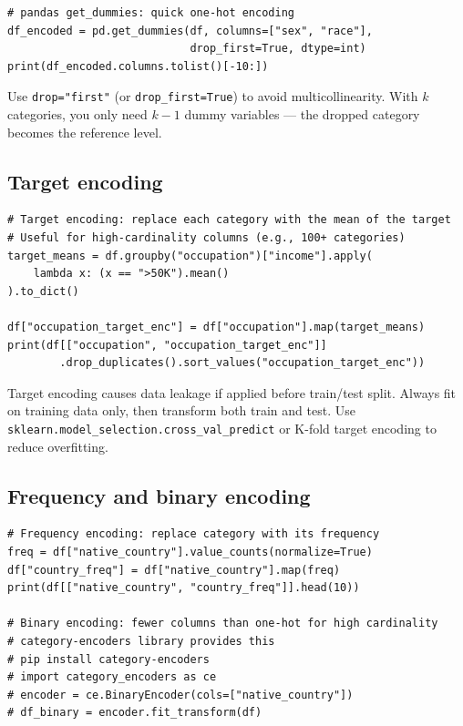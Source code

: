 \begin{verbatim}
# pandas get_dummies: quick one-hot encoding
df_encoded = pd.get_dummies(df, columns=["sex", "race"],
                            drop_first=True, dtype=int)
print(df_encoded.columns.tolist()[-10:])
\end{verbatim}

\begin{preprocesstip}
Use \texttt{drop="first"} (or \texttt{drop\_first=True}) to avoid multicollinearity. With $k$ categories, you only need $k-1$ dummy variables --- the dropped category becomes the reference level.
\end{preprocesstip}

\subsection{Target encoding}

\begin{verbatim}
# Target encoding: replace each category with the mean of the target
# Useful for high-cardinality columns (e.g., 100+ categories)
target_means = df.groupby("occupation")["income"].apply(
    lambda x: (x == ">50K").mean()
).to_dict()

df["occupation_target_enc"] = df["occupation"].map(target_means)
print(df[["occupation", "occupation_target_enc"]]
        .drop_duplicates().sort_values("occupation_target_enc"))
\end{verbatim}

\begin{warningbox}
Target encoding causes data leakage if applied before train/test split. Always fit on training data only, then transform both train and test. Use \texttt{sklearn.model\_selection.cross\_val\_predict} or K-fold target encoding to reduce overfitting.
\end{warningbox}

\subsection{Frequency and binary encoding}

\begin{verbatim}
# Frequency encoding: replace category with its frequency
freq = df["native_country"].value_counts(normalize=True)
df["country_freq"] = df["native_country"].map(freq)
print(df[["native_country", "country_freq"]].head(10))

# Binary encoding: fewer columns than one-hot for high cardinality
# category-encoders library provides this
# pip install category-encoders
# import category_encoders as ce
# encoder = ce.BinaryEncoder(cols=["native_country"])
# df_binary = encoder.fit_transform(df)
\end{verbatim}


